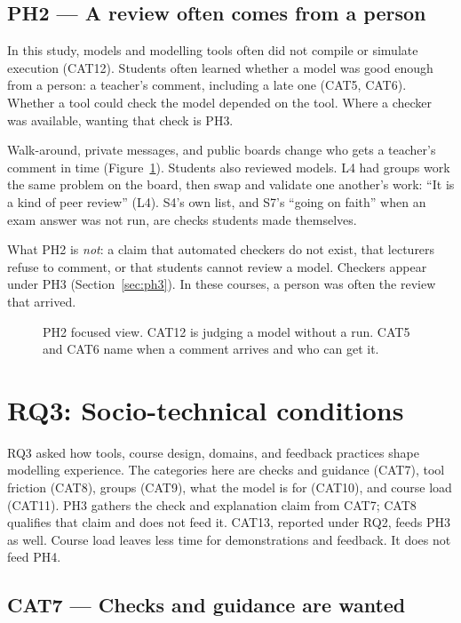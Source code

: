 \subsection{PH2 --- A review often comes from a person}
\label{sec:ph2}

In this study, models and modelling tools often did not compile or simulate execution (CAT12). Students often learned whether a model was good enough from a person: a teacher's comment, including a late one (CAT5, CAT6). Whether a tool could check the model depended on the tool. Where a checker was available, wanting that check is PH3.

Walk-around, private messages, and public boards change who gets a teacher's comment in time (Figure~\ref{fig:ph2}). Students also reviewed models. L4 had groups work the same problem on the board, then swap and validate one another's work: ``It is a kind of peer review'' (L4). S4's own list, and S7's ``going on faith'' when an exam answer was not run, are checks students made themselves.

What PH2 is \emph{not}: a claim that automated checkers do not exist, that lecturers refuse to comment, or that students cannot review a model. Checkers appear under PH3 (Section~\ref{sec:ph3}). In these courses, a person was often the review that arrived.

\begin{figure}[htbp]
\centering

\caption{PH2 focused view. CAT12 is judging a model without a run. CAT5 and CAT6 name when a comment arrives and who can get it.}
\label{fig:ph2}
\end{figure}

\section{RQ3: Socio-technical conditions}
\label{sec:findings_rq3}

RQ3 asked how tools, course design, domains, and feedback practices shape modelling experience. The categories here are checks and guidance (CAT7), tool friction (CAT8), groups (CAT9), what the model is for (CAT10), and course load (CAT11). PH3 gathers the check and explanation claim from CAT7; CAT8 qualifies that claim and does not feed it. CAT13, reported under RQ2, feeds PH3 as well. Course load leaves less time for demonstrations and feedback. It does not feed PH4.

\subsection{CAT7 --- Checks and guidance are wanted}
\label{sec:cat7}

